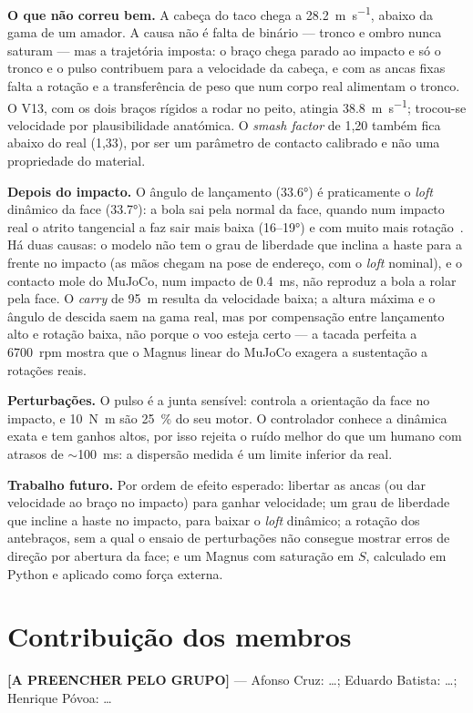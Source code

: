 \documentclass[11pt,a4paper]{article}
\begin{document}
\textbf{O que não correu bem.} A cabeça do taco chega a
\SI{28.2}{\meter\per\second}, abaixo da gama de um amador. A causa não é falta
de binário --- tronco e ombro nunca saturam --- mas a trajetória imposta: o
braço chega parado ao impacto e só o tronco e o pulso contribuem para a
velocidade da cabeça, e com as ancas fixas falta a rotação e a transferência de
peso que num corpo real alimentam o tronco. O V13, com os dois braços rígidos a
rodar no peito, atingia \SI{38.8}{\meter\per\second}; trocou-se velocidade por
plausibilidade anatómica. O \emph{smash factor} de 1,20 também fica abaixo do
real (1,33), por ser um parâmetro de contacto calibrado e não uma propriedade
do material.

\textbf{Depois do impacto.} O ângulo de lançamento (\ang{33.6}) é praticamente
o \emph{loft} dinâmico da face (\ang{33.7}): a bola sai pela normal da face,
quando num impacto real o atrito tangencial a faz sair mais baixa (16--\ang{19})
e com muito mais rotação~\cite{penner2001,penner2003}. Há duas causas: o modelo
não tem o grau de liberdade que inclina a haste para a frente no impacto (as
mãos chegam na pose de endereço, com o \emph{loft} nominal), e o contacto mole
do MuJoCo, num impacto de \SI{0.4}{\milli\second}, não reproduz a bola a rolar
pela face. O \emph{carry} de \SI{95}{\meter} resulta da velocidade baixa; a
altura máxima e o ângulo de descida saem na gama real, mas por compensação
entre lançamento alto e rotação baixa, não porque o voo esteja certo --- a
tacada perfeita a 6700~rpm mostra que o Magnus linear do MuJoCo exagera a
sustentação a rotações reais.

\textbf{Perturbações.} O pulso é a junta sensível: controla a orientação da
face no impacto, e \SI{10}{\newton\meter} são \SI{25}{\percent} do seu motor.
O controlador conhece a dinâmica exata e tem ganhos altos, por isso rejeita o
ruído melhor do que um humano com atrasos de $\sim$\SI{100}{\milli\second}: a
dispersão medida é um limite inferior da real.

\textbf{Trabalho futuro.} Por ordem de efeito esperado: libertar as ancas (ou
dar velocidade ao braço no impacto) para ganhar velocidade; um grau de
liberdade que incline a haste no impacto, para baixar o \emph{loft} dinâmico;
a rotação dos antebraços, sem a qual o ensaio de perturbações não consegue
mostrar erros de direção por abertura da face; e um Magnus com saturação em
$S$, calculado em Python e aplicado como força externa.

\section*{Contribuição dos membros}
\textbf{[A PREENCHER PELO GRUPO]} --- Afonso Cruz: \ldots; Eduardo Batista:
\ldots; Henrique Póvoa: \ldots



\end{document}
